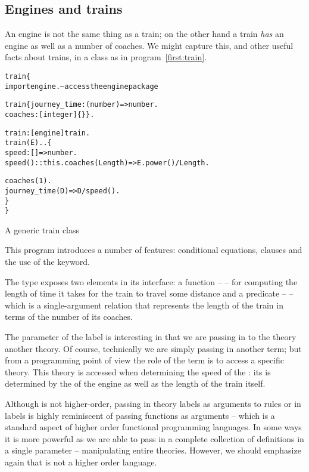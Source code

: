\subsection{Engines and trains}
An engine is not the same thing as a train; on the other hand a train \emph{has} an engine as well as a number of coaches. We might capture this, and other useful facts about trains, in a  class as in program~\vref{first:train}.
\begin{program}
\vspace{0.5ex}
\begin{alltt}
train\{
  import engine.    -- access the engine package
  
  train \impl \{ journey_time:(number)=>number.
             coaches:[integer]\{\} \}.
              
  train:[engine]\conarrow{}train.
  train(E) .. \{
    speed:[]=>number.
    speed()::this.coaches(Length) => E.power()/Length.
   
    coaches(1).
    journey_time(D) => D/speed().
  \}
\}
\end{alltt}
\caption{A generic train class\label{first:train}}
\vspace{-2ex}
\end{program}
This program introduces a number of features: conditional equations, clauses and the use of the  keyword.

The  type exposes two elements in its interface: a function --  -- for computing the length of time it takes for the train to travel some distance and a predicate --  -- which is a single-argument relation that represents the length of the train in terms of the number of its coaches.

The  parameter of the  label is interesting in that we are passing in to the  theory another theory. Of course, technically we are simply passing in another term; but from a programming point of view the role of the  term is to access a specific  theory. This theory is accessed when determining the speed of the : its  is determined by the  of the engine  as well as the length of the train itself.

Although \go is not higher-order, passing in theory labels as arguments to rules or in labels is highly reminiscent of passing functions as arguments -- which is a standard aspect of higher order functional programming languages. In some ways it is more powerful as we are able to pass in a complete collection of definitions in a single parameter -- manipulating entire theories. However, we should emphasize again that \go is not a higher order language. 

